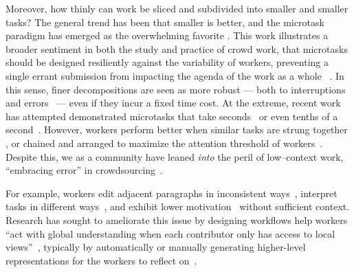 \documentclass[trackingWork]{subfiles}
\begin{document}
Moreover, how thinly can work be sliced and subdivided into smaller and smaller tasks? 
The general trend has been that smaller is better, and the microtask paradigm has emerged as the overwhelming favorite
\cite{selfsourcingTeevan2014,selfsourcingTeevan2016}.
This work illustrates a broader sentiment in both the study and practice
of crowd work, that microtasks should be designed resiliently against the variability of workers, preventing a single errant submission from impacting the agenda of the work as a whole %
~\cite{interruptionIqbal,delayAndOrderLasecki,vaish2014low}.
In this sense, finer decompositions are seen as more robust --- both to interruptions and errors~\cite{cheng2015break} --- even if they incur a fixed time cost.
At the extreme, recent work has attempted demonstrated microtasks that take seconds~\cite{Vaish:2014:TCC:2611222.2556996,Cai:2015:WLW:2702123.2702267} or even tenths of a second~\cite{embracingErrorKrishna}.
However, workers perform better when similar tasks are strung together 
\cite{delayAndOrderLasecki}, or chained and arranged to maximize  the attention threshold of workers~\cite{Cai:2016:CRI:2858036.2858237}.
Despite this, 
we as a community have leaned \textit{into} the peril of
low--context work, ``embracing error'' in crowdsourcing~\cite{embracingErrorKrishna}.


For example, workers edit adjacent paragraphs in inconsistent ways~\cite{bernsteinSoylent,Kim2017}, interpret tasks in different ways~\cite{kairam2016parting}, and exhibit lower motivation~\cite{Kinnaird:2012:WTM:2389176.2389219} without sufficient context.
Research has sought to ameliorate this issue by designing workflows help workers ``act with global understanding when each contributor only has access to local views''~\cite{verroios2014context}, typically by automatically or manually generating higher-level representations for the workers to reflect on~\cite{chilton2013cascade,verroios2014context,Kim2017}.
\end{document}
